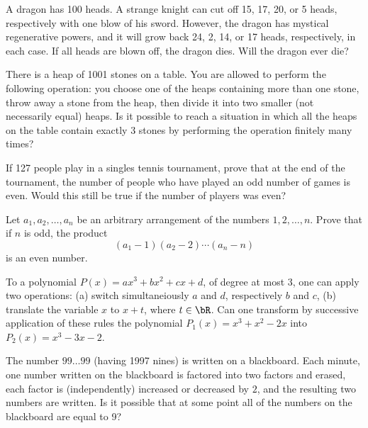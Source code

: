\documentclass[12pt]{article}
\begin{document}
        \begin{exercise}
            A dragon has 100 heads. A strange knight can cut off 15, 17, 20, or 5 heads, respectively with one blow of his sword. However, the dragon has mystical regenerative powers, and it will grow back 24, 2, 14, or 17 heads, respectively, in each case. If all heads are blown off, the dragon dies. Will the dragon ever die?
        \end{exercise}
    
        \begin{exercise}
            There is a heap of 1001 stones on a table. You are allowed to perform the following operation: you choose one of the heaps containing more than one stone, throw away a stone from the heap, then divide it into two smaller (not necessarily equal) heaps. Is it possible to reach a situation in which all the heaps on the table contain exactly 3 stones by performing the operation finitely many times?
        \end{exercise}

        \begin{exercise}
            If 127 people play in a singles tennis tournament, prove that at the end of the tournament, the number of people who have played an odd number of games is even. Would this still be true if the number of players was even?
        \end{exercise}
    
        \begin{exercise}
            Let \(a_1,a_2,\ldots,a_n\) be an arbitrary arrangement of the numbers \(1,2,\ldots,n\). Prove that if \(n\) is odd, the product
            \[(a_1-1)(a_2-2)\cdots(a_n-n)\]
            is an even number.
        \end{exercise}
    
        \begin{exercise}
            To a polynomial \(P(x)=ax^3+bx^2+cx+d\), of degree at most 3, one can apply two operations: (a) switch simultaneiously \(a\) and \(d\), respectively \(b\) and \(c\), (b) translate the variable \(x\) to \(x+t\), where \(t\in\bR\). Can one transform by successive application of these rules the polynomial \(P_1(x)=x^3+x^2-2x\) into \(P_2(x)=x^3-3x-2\). 
        \end{exercise}
    
        \begin{exercise}
            The number \(99\ldots99\) (having 1997 nines) is written on a blackboard. Each minute, one number written on the blackboard is factored into two factors and erased, each factor is (independently) increased or decreased by \(2\), and the resulting two numbers are written. Is it possible that at some point all of the numbers on the blackboard are equal to 9?
        \end{exercise}
\end{document}
